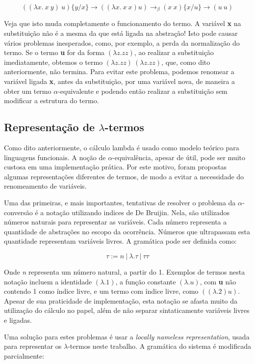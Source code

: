 \[ ((\lambda x.\ x\ y)\ u)\{y/x\} \rightarrow ((\lambda x.\ x\ x) u)
\rightarrow_\beta (x\ x)\{x/u\} \rightarrow (u\ u) \]

Veja que isto muda completamente o funcionamento do termo. A variável \textbf{x}
na substituição não é a mesma da que está ligada na abstração! Isto pode causar
vários problemas inesperados, como, por exemplo, a perda da normalização do
termo. Se o termo \textbf{u} for da forma $(\lambda z. z z)$, ao realizar a
substituição imediatamente, obtemos o termo $(\lambda z. z z)\ (\lambda z. z z)$,
que, como dito anteriormente, não termina.
Para evitar este problema, podemos renomear a variável ligada \textbf{x}, antes
da substituição, por uma variável nova, de maneira a obter um termo
$\alpha$-equivalente e podendo então realizar a substituição sem modificar a
estrutura do termo.

\subsection{Representação de $\lambda$-termos}

Como dito anteriormente, o cálculo lambda é usado como modelo teórico para
linguagens funcionais. A noção de $\alpha$-equivalência, apesar de útil, pode ser
muito custosa em uma implementação prática. Por este motivo, foram propostas
algumas representações diferentes de termos, de modo a evitar a necessidade do
renomeamento de variáveis. 

Uma das primeiras, e mais importantes, tentativas de resolver o problema da
$\alpha$-conversão é a notação utilizando indices de De Bruijin. Nela, são
utilizados números naturais para representar as variáveis. Cada número
representa a quantidade de abstrações no escopo da ocorrência. Números que
ultrapassam esta quantidade representam variáveis livres. A gramática pode ser
definida como:

\[ \tau := n\ |\ \lambda . \tau\ |\ \tau \tau \]

Onde \textit{n} representa um número natural, a partir do 1. Exemplos de termos
nesta notação incluem a identidade $(\lambda. 1)$, a função constante $(\lambda.
u)$, com \textbf{u} não contendo 1 como índice livre, e um termo com índice
livre, como $((\lambda.2) u)$. Apesar de sua praticidade de implementação, esta
notação se afasta muito da utilização do cálculo no papel, além de não separar
sintaticamente variáveis livres e ligadas.

Uma solução para estes problemas é usar a \textit{locally nameless
representation}, usada para representar os $\lambda$-termos neste trabalho.
A gramática do sistema é modificada parcialmente:

